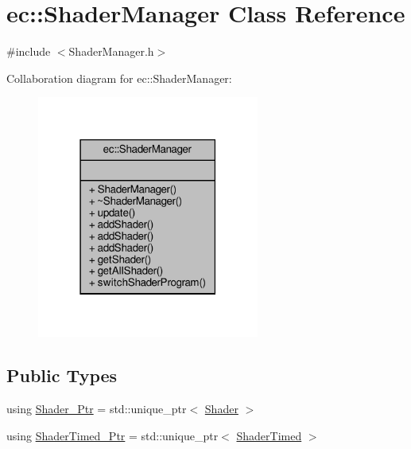 \hypertarget{classec_1_1_shader_manager}{}\section{ec\+:\+:Shader\+Manager Class Reference}
\label{classec_1_1_shader_manager}


{\ttfamily \#include $<$Shader\+Manager.\+h$>$}



Collaboration diagram for ec\+:\+:Shader\+Manager\+:\nopagebreak
\begin{figure}[H]
\begin{center}
\leavevmode
\includegraphics[width=207pt]{classec_1_1_shader_manager__coll__graph}
\end{center}
\end{figure}
\subsection*{Public Types}
\begin{DoxyCompactItemize}
\item 
using \mbox{\hyperlink{classec_1_1_shader_manager_a55148a133c8ead8c61a0370dfba2d132}{Shader\+\_\+\+Ptr}} = std\+::unique\+\_\+ptr$<$ \mbox{\hyperlink{classec_1_1_shader}{Shader}} $>$
\item 
using \mbox{\hyperlink{classec_1_1_shader_manager_a43eaaa56325923c6cb6280f83f8ca08a}{Shader\+Timed\+\_\+\+Ptr}} = std\+::unique\+\_\+ptr$<$ \mbox{\hyperlink{classec_1_1_shader_timed}{Shader\+Timed}} $>$
\end{DoxyCompactItemize}
